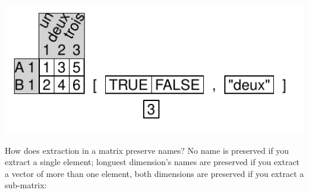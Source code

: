 \documentclass[pdflatex]{article}
\begin{document}
\includegraphics{matrix_extraction5}

How does extraction in a matrix preserve names? No name is preserved if you extract a single element; longuest dimension's names are preserved if you extract a vector of more than one element, both dimensions are preserved if you extract a sub-matrix:
\end{document}
